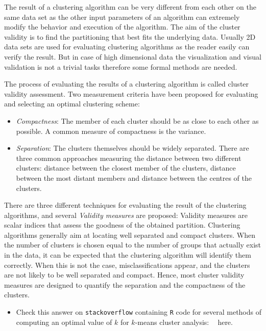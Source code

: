 \documentclass[]{book}
\newenvironment{rmdblock}[1]
  {\begin{shaded*}
  \begin{itemize}
  \renewcommand{\labelitemi}{
    \raisebox{-.7\height}[0pt][0pt]{
      {\setkeys{Gin}{width=2em,keepaspectratio}\texttt{[image: img/icons/\#1]}}
    }
  }
  \item
  }
  {
  \end{itemize}
  \end{shaded*}
  }
\newenvironment{rmdinsight}
  {\begin{rmdblock}{insight}}
  {\end{rmdblock}}
\begin{document}
The result of a clustering algorithm can be very different from each
other on the same data set as the other input parameters of an algorithm
can extremely modify the behavior and execution of the algorithm. The
aim of the cluster validity is to find the partitioning that best fits
the underlying data. Usually 2D data sets are used for evaluating
clustering algorithms as the reader easily can verify the result. But in
case of high dimensional data the visualization and visual validation is
not a trivial tasks therefore some formal methods are needed.

The process of evaluating the results of a clustering algorithm is
called cluster validity assessment. Two measurement criteria have been
proposed for evaluating and selecting an optimal clustering scheme:

\begin{itemize}
\item
  \emph{Compactness}: The member of each cluster should be as close to
  each other as possible. A common measure of compactness is the
  variance.
\item
  \emph{Separation}: The clusters themselves should be widely separated.
  There are three common approaches measuring the distance between two
  different clusters: distance between the closest member of the
  clusters, distance between the most distant members and distance
  between the centres of the clusters.
\end{itemize}

There are three different techniques for evaluating the result of the
clustering algorithms, and several \emph{Validity measures} are
proposed: Validity measures are scalar indices that assess the goodness
of the obtained partition. Clustering algorithms generally aim at
locating well separated and compact clusters. When the number of
clusters is chosen equal to the number of groups that actually exist in
the data, it can be expected that the clustering algorithm will identify
them correctly. When this is not the case, misclassifications appear,
and the clusters are not likely to be well separated and compact. Hence,
most cluster validity measures are designed to quantify the separation
and the compactness of the clusters.

\begin{rmdinsight}
Check this answer on \texttt{stackoverflow} containing \texttt{R} code
for several methods of computing an optimal value of \(k\) for
\(k\)-means cluster analysis:
\textcolor{white}{[}\faStackOverflow\textcolor{white}{]} here.
\end{rmdinsight}
\end{document}

